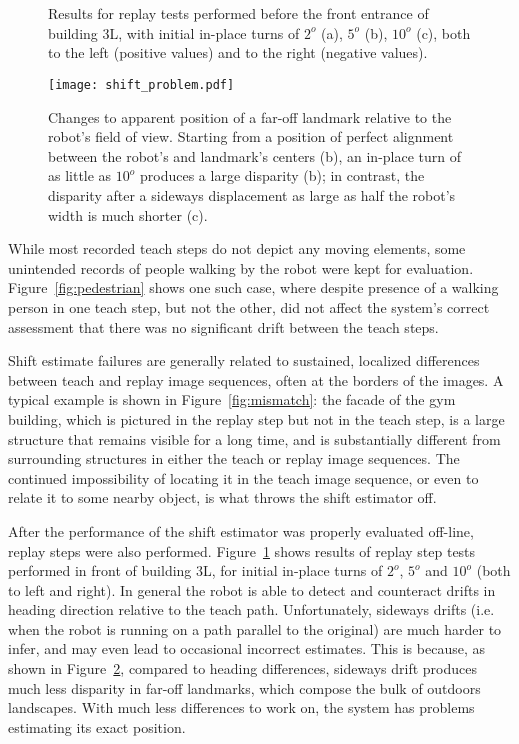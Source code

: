 \documentclass[twocolumn, 9pt,fleqn]{jsproceedings}
\begin{document}
\begin{figure}[h!]
\centering
{}\\
\\
\caption{Results for replay tests performed before the front entrance of building 3L, with initial in-place turns of $2^o$ (a),  $5^o$ (b), $10^o$ (c), both to the left (positive values) and to the right (negative values). }
\label{fig:replay_tests}
\end{figure}

\begin{figure}[h!]
\texttt{[image: shift\_problem.pdf]}
\caption{Changes to apparent position of a far-off landmark relative to the robot's field of view. Starting from a position of perfect alignment between the robot's and landmark's centers (b), an in-place turn of as little as $10^o$ produces a large disparity (b); in contrast, the disparity after a sideways displacement as large as half the robot's width is much shorter (c).}
\label{fig:shift_problem}
\end{figure}

While most recorded teach steps do not depict any moving elements, some unintended records of people walking by the robot were kept for evaluation. Figure~\ref{fig:pedestrian} shows one such case, where despite presence of a walking person in one teach step, but not the other, did not affect the system's correct assessment that there was no significant drift between the teach steps.

Shift estimate failures are generally related to sustained, localized differences between teach and replay image sequences, often at the borders of the images. A typical example is shown in Figure~\ref{fig:mismatch}: the facade of the gym building, which is pictured in the replay step but not in the teach step, is a large structure that remains visible for a long time, and is substantially different from surrounding structures in either the teach or replay image sequences. The continued impossibility of locating it in the teach image sequence, or even to relate it to some nearby object, is what throws the shift estimator off.

After the performance of the shift estimator was properly evaluated off-line, replay steps were also performed. Figure~\ref{fig:replay_tests} shows results of replay step tests performed in front of building 3L, for initial in-place turns of $2^o$, $5^o$ and $10^o$ (both to left and right). In general the robot is able to detect and counteract drifts in heading direction relative to the teach path. Unfortunately, sideways drifts (i.e. when the robot is running on a path parallel to the original) are much harder to infer, and may even lead to occasional incorrect estimates. This is because, as shown in Figure~\ref{fig:shift_problem}, compared to heading differences, sideways drift produces much less disparity in far-off landmarks, which compose the bulk of outdoors landscapes. With much less differences to work on, the system has problems estimating its exact position.
\end{document}
